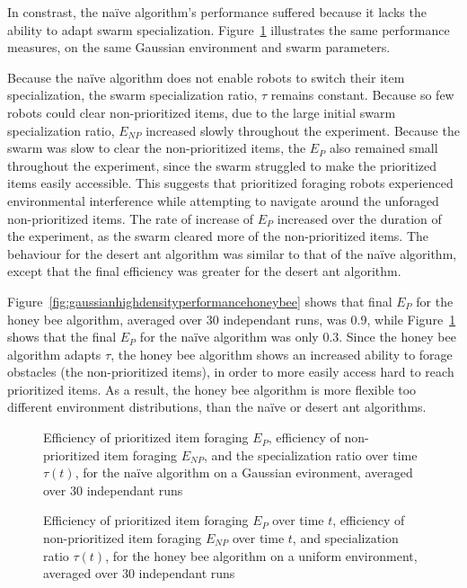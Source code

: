 In constrast, the na\"ive algorithm's performance suffered because it lacks the ability to adapt swarm specialization. Figure~\ref{fig:gaussianhighdensityperformancenaive} illustrates the same performance measures, on the same Gaussian environment and swarm parameters. 

Because the na\"ive algorithm does not enable robots to switch their item specialization, the swarm specialization ratio, $\tau$ remains constant. Because so few robots could clear non-prioritized items, due to the large initial swarm specialization ratio, $E_{NP}$ increased slowly throughout the experiment. Because the swarm was slow to clear the non-prioritized items, the $E_P$ also remained small throughout the experiment, since the swarm struggled to make the prioritized items easily accessible. This suggests that prioritized foraging robots experienced environmental interference while attempting to navigate around the unforaged non-prioritized items. The rate of increase of $E_P$ increased over the duration of the experiment, as the swarm cleared more of the non-prioritized items. The behaviour for the desert ant algorithm was similar to that of the na\"ive algorithm, except that the final efficiency was greater for the desert ant algorithm.


Figure~\ref{fig:gaussianhighdensityperformancehoneybee} shows that final $E_P$ for the honey bee algorithm, averaged over 30 independant runs, was 0.9, while Figure~\ref{fig:gaussianhighdensityperformancenaive} shows that the final $E_P$ for the na\"ive algorithm was only 0.3. Since the honey bee algorithm adapts $\tau$, the honey bee algorithm shows an increased ability to forage obstacles (the non-prioritized items), in order to more easily access hard to reach prioritized items. As a result, the honey bee algorithm is more flexible too different environment distributions, than the na\"ive or desert ant algorithms.

\begin{figure}[!htb]
\centering
\small
\resizebox{\textwidth}{!}{}
\caption{Efficiency of prioritized item foraging $E_P$, efficiency of non-prioritized item foraging $E_{NP}$, and the specialization ratio over time $\tau(t)$, for the na\"ive algorithm on a Gaussian evironment, averaged over 30 independant runs}
\label{fig:gaussianhighdensityperformancenaive}
\end{figure}

\begin{figure}[!htb]
\centering
\small
\resizebox{\textwidth}{!}{}
\caption{Efficiency of prioritized item foraging $E_P$ over time $t$, efficiency of non-prioritized item foraging $E_{NP}$ over time $t$, and specialization ratio $\tau(t)$, for the honey bee algorithm on a uniform environment, averaged over 30 independant runs}
\label{fig:uniformhighdensityperformancehoneybee}
\end{figure}


